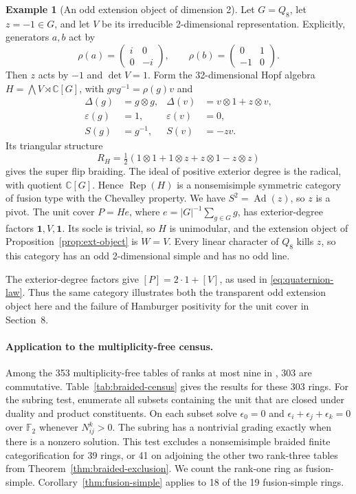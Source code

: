 \documentclass[11pt,reqno]{amsart}
\theoremstyle{definition}
\newtheorem{example}[theorem]{Example}
\newcommand{\one}{\mathbf 1}
\newcommand{\CC}{\mathbb C}
\newcommand{\Rep}{\operatorname{Rep}}
\begin{document}
\begin{example}[An odd extension object of dimension 2]\label{ex:q-eight}\label{ex:quaternion-witness}
Let $G=Q_8$, let $z=-1\in G$, and let $V$ be its irreducible 2-dimensional representation. Explicitly, generators $a,b$ act by
\[
 \rho(a)=\begin{pmatrix}i&0\\0&-i\end{pmatrix},\qquad
 \rho(b)=\begin{pmatrix}0&1\\-1&0\end{pmatrix}.
\]
Then $z$ acts by $-1$ and $\det V=1$. Form the 32-dimensional Hopf algebra $H=\bigwedge V\rtimes\CC[G]$, with $gvg^{-1}=\rho(g)v$ and
\begin{align*}
 \Delta(g)&=g\otimes g,& \Delta(v)&=v\otimes1+z\otimes v,\\
 \varepsilon(g)&=1,& \varepsilon(v)&=0,\\
 S(g)&=g^{-1},& S(v)&=-zv.
\end{align*}
Its triangular structure
\[
 R_H=\tfrac12(1\otimes1+1\otimes z+z\otimes1-z\otimes z)
\]
gives the super flip braiding. The ideal of positive exterior degree is the radical, with quotient $\CC[G]$. Hence $\Rep(H)$ is a nonsemisimple symmetric category of fusion type with the Chevalley property. We have $S^2=\operatorname{Ad}(z)$, so $z$ is a pivot. The unit cover $P=He$, where $e=|G|^{-1}\sum_{g\in G}g$, has exterior-degree factors $\one,V,\one$. Its socle is trivial, so $H$ is unimodular, and the extension object of Proposition~\ref{prop:ext-object} is $W=V$. Every linear character of $Q_8$ kills $z$, so this category has an odd 2-dimensional simple and has no odd line.

The exterior-degree factors give $[P]=2\cdot1+[V]$, as used in \eqref{eq:quaternion-law}. Thus the same category illustrates both the transparent odd extension object here and the failure of Hamburger positivity for the unit cover in Section~8.
\end{example}

\paragraph{Application to the multiplicity-free census.}\label{sec:parity-census}
Among the 353 multiplicity-free tables of ranks at most nine in \cite{Census,VSrings}, 303 are commutative. Table~\ref{tab:braided-census} gives the results for these 303 rings. For the subring test, enumerate all subsets containing the unit that are closed under duality and product constituents. On each subset solve $\epsilon_0=0$ and $\epsilon_i+\epsilon_j+\epsilon_k=0$ over $\mathbb F_2$ whenever $N_{ij}^k>0$. The subring has a nontrivial grading exactly when there is a nonzero solution. This test excludes a nonsemisimple braided finite categorification for 39 rings, or 41 on adjoining the other two rank-three tables from Theorem~\ref{thm:braided-exclusion}. We count the rank-one ring as fusion-simple. Corollary~\ref{thm:fusion-simple} applies to 18 of the 19 fusion-simple rings.
\end{document}
